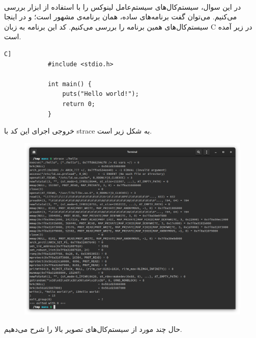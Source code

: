 \documentclass{article}
\begin{document}
	\paragraph*{}
	در این سوال، سیستم‌کال‌های سیستم‌عامل لینوکس را با استفاده از ابزار
	بررسی می‌کنیم. می‌توان گفت
	برنامه‌های ساده، همان برنامه‌ی
	مشهور است؛ و در اینجا سیستم‌کال‌های همین برنامه را بررسی می‌کنیم. کد این برنامه به زبان C در زیر آمده است.

	\lstset{
		basicstyle=\ttfamily,
		numbers=left,
		xleftmargin=15pt,
		numberstyle=\ttfamily,
		autogobble=true,
		tabsize=4
	}

	\begin{latin}
		\begin{lstlisting}[name=[ansi]C]
			#include <stdio.h>

			int main() {
				puts("Hello world!");
				return 0;
			}
		\end{lstlisting}
	\end{latin}

	خروجی اجرای این کد با strace به شکل زیر است.

	\begin{figure}[H]
		\centering
		\includegraphics*[width=\textwidth]{strace}
	\end{figure}

	حال چند مورد از سیستم‌کال‌های تصویر بالا را شرح می‌دهیم.
\end{document}
